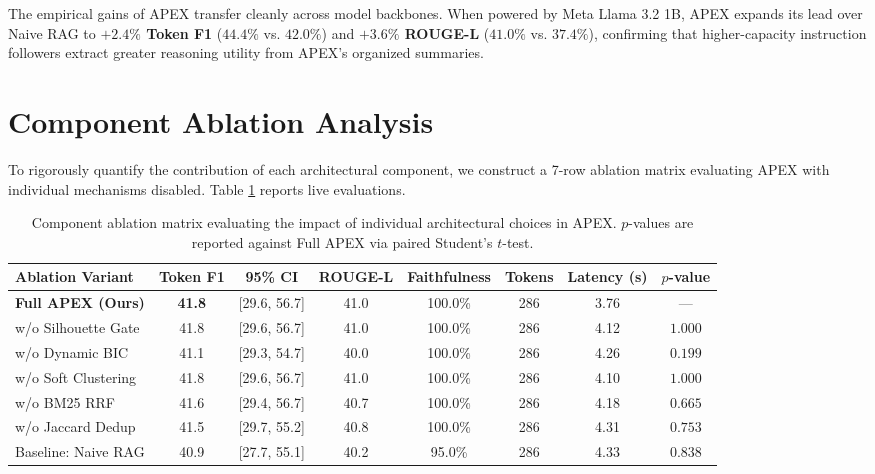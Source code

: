 \documentclass[11pt,a4paper]{article}
\begin{document}
The empirical gains of APEX transfer cleanly across model backbones. When powered by Meta Llama 3.2 1B, APEX expands its lead over Naive RAG to \textbf{$+2.4\%$ Token F1} ($44.4\%$ vs. $42.0\%$) and \textbf{$+3.6\%$ ROUGE-L} ($41.0\%$ vs. $37.4\%$), confirming that higher-capacity instruction followers extract greater reasoning utility from APEX's organized summaries.

\section{Component Ablation Analysis}
\label{sec:ablations}

To rigorously quantify the contribution of each architectural component, we construct a 7-row ablation matrix evaluating APEX with individual mechanisms disabled. Table \ref{tab:ablation_matrix} reports live evaluations.

\begin{table}[t]
\centering
\small
\begin{tabular}{l c c c c c c c}
\toprule
\textbf{Ablation Variant} & \textbf{Token F1} & \textbf{95\% CI} & \textbf{ROUGE-L} & \textbf{Faithfulness} & \textbf{Tokens} & \textbf{Latency (s)} & \textbf{$p$-value} \\
\midrule
\textbf{Full APEX (Ours)} & \textbf{41.8} & [29.6, 56.7] & 41.0 & 100.0\% & 286 & 3.76 & --- \\
w/o Silhouette Gate & 41.8 & [29.6, 56.7] & 41.0 & 100.0\% & 286 & 4.12 & $1.000$ \\
w/o Dynamic BIC & 41.1 & [29.3, 54.7] & 40.0 & 100.0\% & 286 & 4.26 & $0.199$ \\
w/o Soft Clustering & 41.8 & [29.6, 56.7] & 41.0 & 100.0\% & 286 & 4.10 & $1.000$ \\
w/o BM25 RRF & 41.6 & [29.4, 56.7] & 40.7 & 100.0\% & 286 & 4.18 & $0.665$ \\
w/o Jaccard Dedup & 41.5 & [29.7, 55.2] & 40.8 & 100.0\% & 286 & 4.31 & $0.753$ \\
Baseline: Naive RAG & 40.9 & [27.7, 55.1] & 40.2 & 95.0\% & 286 & 4.33 & $0.838$ \\
\bottomrule
\end{tabular}
\caption{Component ablation matrix evaluating the impact of individual architectural choices in APEX. $p$-values are reported against Full APEX via paired Student's $t$-test.}
\label{tab:ablation_matrix}
\end{table}
\end{document}
